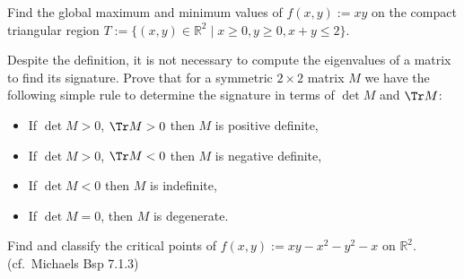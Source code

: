 
\begin{aiexercise}
\label{ex:ai_extrema_triangle}
Find the global maximum and minimum values of $f(x,y) := xy$ on the compact triangular region $T := \{(x,y) \in \mathbb{R}^2 \mid x \ge 0, y \ge 0, x+y \le 2\}$.
\end{aiexercise}




\begin{exercise}
\label{ex:signature_2x2_matrix}
Despite the definition, it is not necessary to compute the eigenvalues of a matrix to find its
signature. Prove that for a symmetric $2\times 2$ matrix $M$ we have the following simple rule to
determine the signature in terms of $\det M$ and $\Tr M$:
\begin{itemize}
  \item If $\det M > 0$, $\Tr M > 0$ then $M$ is positive definite,
  \item If $\det M > 0$, $\Tr M < 0$ then $M$ is negative definite,
  \item If $\det M < 0$ then $M$ is indefinite,
  \item If $\det M = 0$, then $M$ is degenerate.
\end{itemize}
\end{exercise}

\begin{exercise}
\label{ex:classifying_critical_points_xy}
Find and classify the critical points of $f(x,y) := xy - x^2 - y^2 - x$ on $\mathbb{R}^2$. (cf.\ Michaels Bsp 7.1.3)
\end{exercise}

